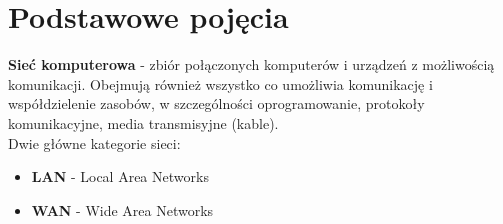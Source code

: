 \documentclass[a4paper]{article}
\begin{document}
%
%



\section{Podstawowe pojęcia}
\textbf{Sieć komputerowa} - zbiór połączonych komputerów i urządzeń z możliwością komunikacji. Obejmują	również	wszystko co	umożliwia
komunikację i współdzielenie zasobów, w szczególności oprogramowanie, protokoły komunikacyjne, media transmisyjne (kable).
\\
Dwie główne kategorie sieci:
\begin{itemize}
    \item \textbf{LAN} - Local Area Networks
    \item \textbf{WAN} - Wide Area Networks
\end{itemize}
\end{document}
